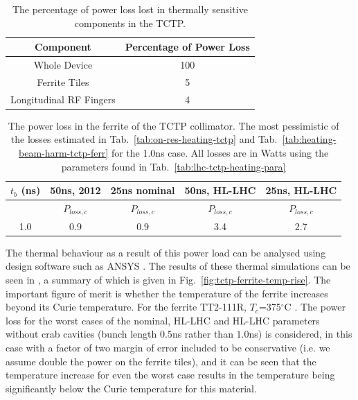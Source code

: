 \begin{table}
\caption{The percentage of power loss lost in thermally sensitive components in the TCTP.}
\label{tab:tctp-heating-loc}
\begin{center}
\begin{tabular}{c | c}
Component & Percentage of Power Loss \\ \hline
Whole Device & 100 \\ \hline
Ferrite Tiles & 5 \\ \hline
Longitudinal RF Fingers & 4 \\
\end{tabular}
\end{center}
\end{table}

\begin{table}
\caption{The power loss in the ferrite of the TCTP collimator. The most pessimistic of the losses estimated in Tab.~\ref{tab:on-res-heating-tctp} and Tab.~\ref{tab:heating-beam-harm-tctp-ferr} for the 1.0ns case. All losses are in Watts using the parameters found in Tab.~\ref{tab:lhc-tctp-heating-para}}
\label{tab:heating-ferr-power-load}
\begin{center}
\begin{tabular}{c | c | c | c | c }
$t_{b}$ (ns) & 50ns, 2012 & 25ns nominal & 50ns, HL-LHC & 25ns, HL-LHC \\ \hline
 &  $P_{loss, c}$  & $P_{loss, c}$ &  $P_{loss, c}$  & $P_{loss, c}$ \\ \hline
1.0 & 0.9 & 0.9 & 3.4 & 2.7 
\end{tabular}
\end{center}
\end{table}


The thermal behaviour as a result of this power load can be analysed using design software such as ANSYS \cite{ansys}. The results of these thermal simulations can be seen in \cite{Carra:HeatLoad}, a summary of which is given in Fig.~\ref{fig:tctp-ferrite-temp-rise}. The important figure of merit is whether the temperature of the ferrite increases beyond its Curie temperature. For the ferrite TT2-111R, $T_{c}$=375$^{\circ}$C \cite{tt2111r:datSheet}. The power loss for the worst cases of the nominal, HL-LHC and HL-LHC parameters without crab cavities (bunch length $0.5$ns rather than $1.0$ns) is considered, in this case with a factor of two margin of error included to be conservative (i.e. we assume double the power on the ferrite tiles), and it can be seen that the temperature increase for even the worst case results in the temperature being significantly below the Curie temperature for this material.


